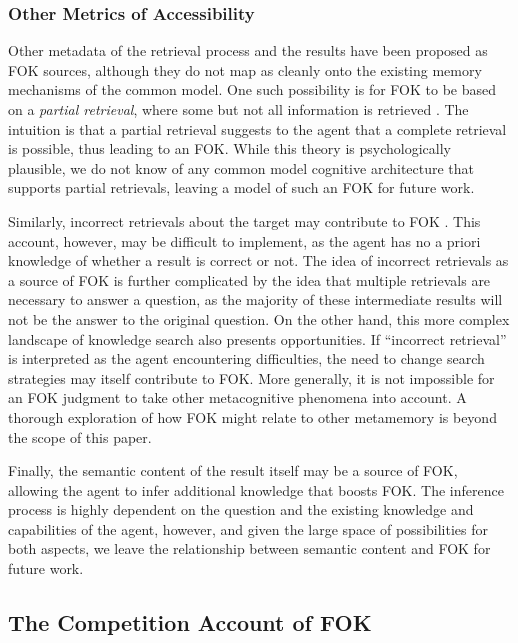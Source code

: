 \documentclass[10pt,letterpaper]{article}
\begin{document}
\subsubsection{Other Metrics of Accessibility} 

Other metadata of the retrieval process and the results have been proposed as FOK sources, although they do not map as cleanly onto the existing memory mechanisms of the common model.
One such possibility is for FOK to be based on a \textit{partial retrieval}, where some but not all information is retrieved \cite{Hanczakowski2017MetamemoryInA}.
The intuition is that a partial retrieval suggests to the agent that a complete retrieval is possible, thus leading to an FOK.
While this theory is psychologically plausible, we do not know of any common model cognitive architecture that supports partial retrievals, leaving a model of such an FOK for future work.

Similarly, incorrect retrievals about the target may contribute to FOK \cite{Koriat1993HowDoWe}.
This account, however, may be difficult to implement, as the agent has no a priori knowledge of whether a result is correct or not.
The idea of incorrect retrievals as a source of FOK is further complicated by the idea that multiple retrievals are necessary to answer a question, as the majority of these intermediate results will not be the answer to the original question.
On the other hand, this more complex landscape of knowledge search also presents opportunities.
If ``incorrect retrieval'' is interpreted as the agent encountering difficulties, the need to change search strategies may itself contribute to FOK.
More generally, it is not impossible for an FOK judgment to take other metacognitive phenomena into account.
A thorough exploration of how FOK might relate to other metamemory is beyond the scope of this paper.

Finally, the semantic content of the result itself may be a source of FOK, allowing the agent to infer additional knowledge that boosts FOK.
The inference process is highly dependent on the question and the existing knowledge and capabilities of the agent, however, and given the large space of possibilities for both aspects, we leave the relationship between semantic content and FOK for future work.

\subsection{The Competition Account of FOK}
\end{document}
